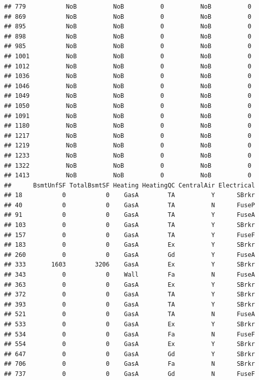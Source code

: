 \documentclass[]{article}
\begin{document}
\begin{verbatim}
## 779           NoB          NoB          0          NoB          0
## 869           NoB          NoB          0          NoB          0
## 895           NoB          NoB          0          NoB          0
## 898           NoB          NoB          0          NoB          0
## 985           NoB          NoB          0          NoB          0
## 1001          NoB          NoB          0          NoB          0
## 1012          NoB          NoB          0          NoB          0
## 1036          NoB          NoB          0          NoB          0
## 1046          NoB          NoB          0          NoB          0
## 1049          NoB          NoB          0          NoB          0
## 1050          NoB          NoB          0          NoB          0
## 1091          NoB          NoB          0          NoB          0
## 1180          NoB          NoB          0          NoB          0
## 1217          NoB          NoB          0          NoB          0
## 1219          NoB          NoB          0          NoB          0
## 1233          NoB          NoB          0          NoB          0
## 1322          NoB          NoB          0          NoB          0
## 1413          NoB          NoB          0          NoB          0
##      BsmtUnfSF TotalBsmtSF Heating HeatingQC CentralAir Electrical
## 18           0           0    GasA        TA          Y      SBrkr
## 40           0           0    GasA        TA          N      FuseP
## 91           0           0    GasA        TA          Y      FuseA
## 103          0           0    GasA        TA          Y      SBrkr
## 157          0           0    GasA        TA          Y      FuseF
## 183          0           0    GasA        Ex          Y      SBrkr
## 260          0           0    GasA        Gd          Y      FuseA
## 333       1603        3206    GasA        Ex          Y      SBrkr
## 343          0           0    Wall        Fa          N      FuseA
## 363          0           0    GasA        Ex          Y      SBrkr
## 372          0           0    GasA        TA          Y      SBrkr
## 393          0           0    GasA        TA          Y      SBrkr
## 521          0           0    GasA        TA          N      FuseA
## 533          0           0    GasA        Ex          Y      SBrkr
## 534          0           0    GasA        Fa          N      FuseF
## 554          0           0    GasA        Ex          Y      SBrkr
## 647          0           0    GasA        Gd          Y      SBrkr
## 706          0           0    GasA        Fa          N      SBrkr
## 737          0           0    GasA        Gd          N      FuseF

\end{verbatim}
\end{document}
